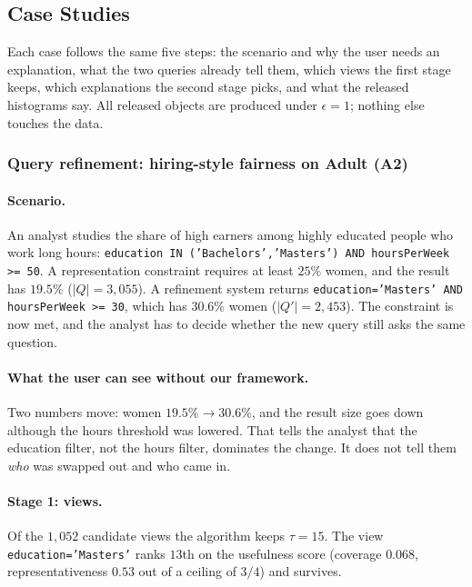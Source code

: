 \subsection{Case Studies}
\label{sec:usecase-results}

Each case follows the same five steps: the scenario and why the user needs an explanation, what the two queries already tell them, which views the first stage keeps, which explanations the second stage picks, and what the released histograms say. All released objects are produced under $\epsilon=1$; nothing else touches the data.

\subsubsection{Query refinement: hiring-style fairness on Adult (A2)}
\label{subsec:case-refinement}

\paragraph{Scenario.}
An analyst studies the share of high earners among highly educated people who work long hours:
\texttt{education IN ('Bachelors','Masters') AND hoursPerWeek >= 50}.
A representation constraint requires at least $25\%$ women, and the result has $19.5\%$ ($|Q|=3{,}055$).
A refinement system returns \texttt{education='Masters' AND hoursPerWeek >= 30}, which has $30.6\%$ women ($|Q'|=2{,}453$).
The constraint is now met, and the analyst has to decide whether the new query still asks the same question.

\paragraph{What the user can see without our framework.}
Two numbers move: women $19.5\%\rightarrow30.6\%$, and the result size goes down although the hours threshold was lowered. That tells the analyst that the education filter, not the hours filter, dominates the change. It does not tell them \emph{who} was swapped out and who came in.

\paragraph{Stage 1: views.}
Of the $1{,}052$ candidate views the algorithm keeps $\tau=15$. The view \texttt{education='Masters'} ranks $13$th on the usefulness score (coverage $0.068$, representativeness $0.53$ out of a ceiling of $3/4$) and survives.


